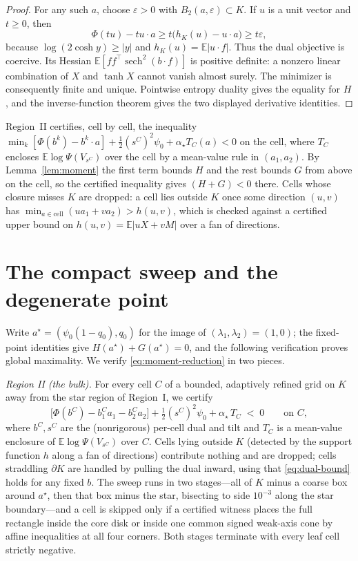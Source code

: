 \documentclass[11pt]{article}
\newcommand{\E}{\mathbb{E}}
\begin{document}
\begin{proof}
For any such $a$, choose $\varepsilon>0$ with
$B_2(a,\varepsilon)\subset K$.  If $u$ is a unit vector and $t\ge0$, then
\[
 \Phi(tu)-tu\cdot a
 \ge t\bigl(h_K(u)-u\cdot a\bigr)\ge t\varepsilon,
\]
because $\log(2\cosh y)\ge|y|$ and $h_K(u)=\E|u\cdot f|$.  Thus the dual
objective is coercive.  Its Hessian
$\E[ff^\top\operatorname{sech}^2(b\cdot f)]$ is positive definite: a
nonzero linear combination of $X$ and $\tanh X$ cannot vanish almost surely.
The minimizer is consequently finite and unique.  Pointwise entropy duality
gives the equality for $H$, and the inverse-function theorem gives the two
displayed derivative identities.
\end{proof}

Region~II certifies, cell by cell, the inequality
$\min_k[\Phi(b^k)-b^k\!\cdot a]+\tfrac12(s^C)^2\psi_0+\alpha_\star T_C(a)<0$ on
the cell, where $T_C$ encloses $\E\log\Psi(V_{s^C})$ over the cell by a
mean-value rule in $(a_1,a_2)$. By Lemma~\ref{lem:moment} the first term
bounds $H$ and the rest bounds $G$ from above on the cell, so the certified
inequality gives $(H+G)<0$ there. Cells whose closure misses $K$ are dropped:
a cell lies outside $K$ once some direction $(u,v)$ has
$\min_{a\in\mathrm{cell}}(u a_1+v a_2)>h(u,v)$, which is checked against a
certified upper bound on $h(u,v)=\E|uX+vM|$ over a fan of directions.

\section{The compact sweep and the degenerate point}\label{sec:huang-sweep}

Write $a^\star=(\psi_0(1-q_0),q_0)$ for the image of $(\lambda_1,\lambda_2)=(1,0)$;
the fixed-point identities give $H(a^\star)+G(a^\star)=0$, and the following
verification proves global maximality. We verify
\eqref{eq:moment-reduction} in two pieces.

\emph{Region II (the bulk).} For every cell $C$ of a bounded, adaptively
refined grid on $K$ away from the star region of Region~I, we certify
\[
  \bigl[\Phi(b^C) - b^C_1 a_1 - b^C_2 a_2\bigr]
  + \tfrac12 (s^C)^2\psi_0 + \alpha_\star\, T_C \;<\; 0
  \qquad\text{on } C,
\]
where $b^C,s^C$ are the (nonrigorous) per-cell dual and tilt and $T_C$ is a
mean-value enclosure of $\E\log\Psi(V_{s^C})$ over $C$. Cells lying outside
$K$ (detected by the support function $h$ along a fan of directions)
contribute nothing and are dropped; cells straddling $\partial K$ are handled
by pulling the dual inward, using that \eqref{eq:dual-bound} holds for any
fixed $b$. The sweep runs in two stages---all of $K$ minus a coarse box
around $a^\star$, then that box minus the star, bisecting to side $10^{-3}$
along the star boundary---and a cell is skipped only if a certified witness
places the full rectangle inside the core disk or inside one common signed
weak-axis cone by affine inequalities at all four corners. Both stages terminate
with every leaf cell strictly negative.
\end{document}
